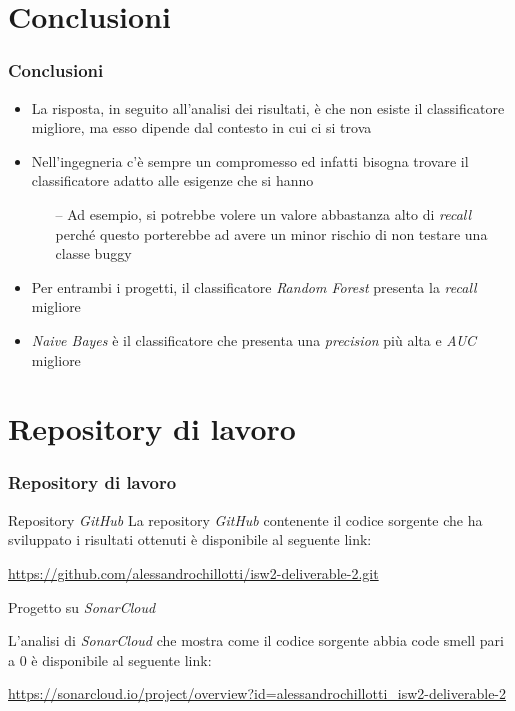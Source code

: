 \documentclass[
	usepdftitle=false,
	xcolor={table, dvipsnames},
	hyperref={
		pdftitle={Machine Learning per Software Engineering},
    	pdfauthor={Alessando Chillotti}
    }
]{beamer}
\begin{document}
\section{Conclusioni}
\begin{frame}
\frametitle{Conclusioni}
\begin{itemize}
\item La risposta, in seguito all'analisi dei risultati, è che non esiste il classificatore migliore, ma esso dipende dal contesto in cui ci si trova
\item Nell'ingegneria c'è sempre un compromesso ed infatti bisogna trovare il classificatore adatto alle esigenze che si hanno
\begin{itemize}
\item[--] Ad esempio, si potrebbe volere un valore abbastanza alto di \textit{recall} perché questo porterebbe ad avere un minor rischio di non testare una classe buggy
\end{itemize}
\item Per entrambi i progetti, il classificatore \textit{Random Forest} presenta la \textit{recall} migliore
\item \textit{Naive Bayes} è il classificatore che presenta una \textit{precision} più alta e \textit{AUC} migliore
\end{itemize}
\end{frame}

\section{Repository di lavoro}
\begin{frame}
\frametitle{Repository di lavoro}
\begin{block}{Repository \textit{GitHub}}
La repository \textit{GitHub} contenente il codice sorgente che ha sviluppato i risultati ottenuti è disponibile al seguente link:
\begin{center}
\scriptsize{\url{https://github.com/alessandrochillotti/isw2-deliverable-2.git}}
\end{center}
\end{block}

\begin{block}{Progetto su \textit{SonarCloud}}

L'analisi di \textit{SonarCloud} che mostra come il codice sorgente abbia code smell pari a 0 è disponibile al seguente link:
\begin{center}
\scriptsize{\url{https://sonarcloud.io/project/overview?id=alessandrochillotti_isw2-deliverable-2}}
\end{center}
\end{block}
\end{frame}
\end{document}
